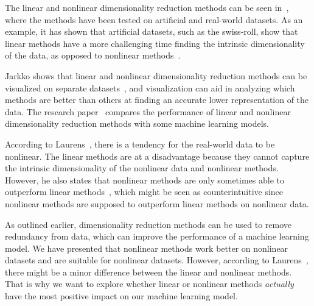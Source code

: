 The linear and nonlinear dimensionality reduction methods can be seen in~\cite{dimensionality-reduction-comparative-review, tennenbaum}, where the methods have been tested on artificial and real-world datasets. As an example, it has shown that artificial datasets, such as the swiss-roll, show that linear methods have a more challenging time finding the intrinsic dimensionality of the data, as opposed to nonlinear methods~\cite{tennenbaum}.

Jarkko shows that linear and nonlinear dimensionality reduction methods can be visualized on separate datasets~\cite{dim-red-visual}, and visualization can aid in analyzing which methods are better than others at finding an accurate lower representation of the data. The research paper~\cite{dimensionality-reduction-comparative-review} compares the performance of linear and nonlinear dimensionality reduction methods with some machine learning models.

According to Laurens~\cite{dimensionality-reduction-comparative-review}, there is a tendency for the real-world data to be nonlinear. The linear methods are at a disadvantage because they cannot capture the intrinsic dimensionality of the nonlinear data and nonlinear methods. However, he also states that nonlinear methods are only sometimes able to outperform linear methods~\cite{dimensionality-reduction-comparative-review}, which might be seen as counterintuitive since nonlinear methods are supposed to outperform linear methods on nonlinear data.

As outlined earlier, dimensionality reduction methods can be used to remove redundancy from data, which can improve the performance of a machine learning model. We have presented that nonlinear methods work better on nonlinear datasets and are suitable for nonlinear datasets. However, according to Laurens~\cite{dimensionality-reduction-comparative-review}, there might be a minor difference between the linear and nonlinear methods. That is why we want to explore whether linear or nonlinear methods \textit{actually} have the most positive impact on our machine learning model.







